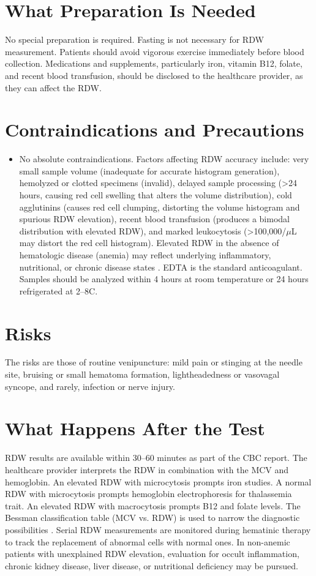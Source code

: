 \section*{What Preparation Is Needed}
No special preparation is required. Fasting is not necessary for RDW measurement. Patients should avoid vigorous exercise immediately before blood collection. Medications and supplements, particularly iron, vitamin B12, folate, and recent blood transfusion, should be disclosed to the healthcare provider, as they can affect the RDW.

\section*{Contraindications and Precautions}
\begin{itemize}
  \item No absolute contraindications. Factors affecting RDW accuracy include: very small sample volume (inadequate for accurate histogram generation), hemolyzed or clotted specimens (invalid), delayed sample processing (>24 hours, causing red cell swelling that alters the volume distribution), cold agglutinins (causes red cell clumping, distorting the volume histogram and spurious RDW elevation), recent blood transfusion (produces a bimodal distribution with elevated RDW), and marked leukocytosis (>100,000/$\mu$L may distort the red cell histogram). Elevated RDW in the absence of hematologic disease (anemia) may reflect underlying inflammatory, nutritional, or chronic disease states \cite{wallach2022interpretation}. EDTA is the standard anticoagulant. Samples should be analyzed within 4 hours at room temperature or 24 hours refrigerated at 2--8\textdegree{}C.
\end{itemize}
\section*{Risks}
The risks are those of routine venipuncture: mild pain or stinging at the needle site, bruising or small hematoma formation, lightheadedness or vasovagal syncope, and rarely, infection or nerve injury.

\section*{What Happens After the Test}
RDW results are available within 30--60 minutes as part of the CBC report. The healthcare provider interprets the RDW in combination with the MCV and hemoglobin. An elevated RDW with microcytosis prompts iron studies. A normal RDW with microcytosis prompts hemoglobin electrophoresis for thalassemia trait. An elevated RDW with macrocytosis prompts B12 and folate levels. The Bessman classification table (MCV vs. RDW) is used to narrow the diagnostic possibilities \cite{kaushansky2021williams}. Serial RDW measurements are monitored during hematinic therapy to track the replacement of abnormal cells with normal ones. In non-anemic patients with unexplained RDW elevation, evaluation for occult inflammation, chronic kidney disease, liver disease, or nutritional deficiency may be pursued.

